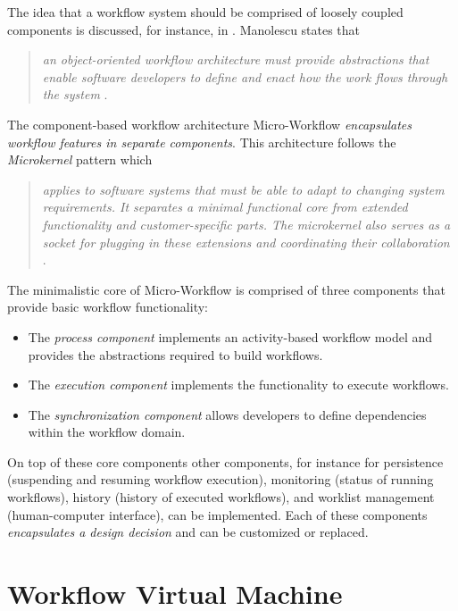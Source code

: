 The idea that a workflow system should be comprised of loosely coupled
components is discussed, for instance, in \cite{DAM01,DG95,PM99}. Manolescu
states that

\begin{quote}
\emph{an object-oriented workflow architecture must \emph{provide abstractions}
that enable software developers to define and enact how the work flows through
the system} \cite{DAM01}.
\end{quote}

The component-based workflow architecture Micro-Workflow \emph{encapsulates
workflow features in separate components}. This architecture follows the
\emph{Microkernel} pattern which

\begin{quote}
\emph{applies to software systems that must be able to adapt to changing
system requirements. It separates a minimal functional core from extended
functionality and customer-specific parts. The microkernel also serves as a
socket for plugging in these extensions and coordinating their
collaboration} \cite{FB96}.
\end{quote}

The minimalistic core of Micro-Workflow is comprised of three components that
provide basic workflow functionality:

\begin{itemize}
\item The \emph{process component} implements an activity-based workflow model
      and provides the abstractions required to build workflows.
\item The \emph{execution component} implements the functionality to execute
      workflows.
\item The \emph{synchronization component} allows developers to define
      dependencies within the workflow domain.
\end{itemize}

On top of these core components other components, for instance for persistence
(suspending and resuming workflow execution), monitoring (status of running
workflows), history (history of executed workflows), and worklist management
(human-computer interface), can be implemented. Each of these components
\emph{encapsulates a design decision} and can be customized or replaced.

\section{Workflow Virtual Machine}
\label{section-WorkflowVirtualMachine}

